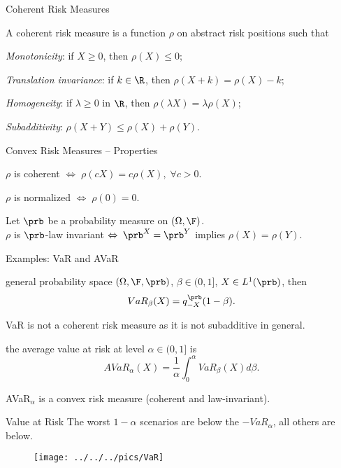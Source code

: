 {Coherent Risk Measures}

A coherent risk measure is a function $\rho$ on abstract risk positions such that






	\emph{Monotonicity}: if $X\geq 0$, then $\rho(X)\leq 0$;


	\emph{Translation invariance}: if $k \in \R$, then
$\rho(X+k)=\rho(X)-k$;


	\emph{Homogeneity}: if $\lambda \geq 0$ in $\R$, then $\rho(\lambda X)
= \lambda \rho (X)$;


	\emph{Subadditivity}: $\rho(X+Y)\leq \rho(X)+\rho(Y)$.





{Convex Risk Measures -- Properties}







	$\rho$ is coherent $\Leftrightarrow \; \rho(cX) = c \rho(X), \; \forall c>0$.


	$\rho$ is normalized $\Leftrightarrow \; \rho(0) = 0$.


	Let $\prb$ be a probability measure on $(\Omega, \F)$.\\
$\rho$ is $\prb$-law invariant $\Leftrightarrow \; \prb^X = \prb^Y $ implies $\rho(X) = \rho(Y)$.





{Examples: VaR and AVaR}






	general probability space $(\Omega, \F, \prb)$, $\beta \in (0,1]$, $X\in L^1(\prb)$, then
$$
VaR_\beta(X) = q_{-X}^{\prb}(1-\beta).
$$


	VaR is not a coherent risk measure as it is not subadditive in general.


	the average value at risk at level $\alpha \in (0,1]$ is
$$
AVaR_\alpha(X) = \frac{1}{\alpha} \int_0^\alpha VaR_\beta(X) d\beta.
$$


	AVaR$_\alpha$ is a convex risk measure (coherent and law-invariant).





{Value at Risk}
The worst $1-\alpha$ scenarios are below the $-VaR_\alpha$, all others are below.
\begin{figure}
	\centering
		\texttt{[image: ../../../pics/VaR]}
	\label{fig:VaR}
\end{figure}

